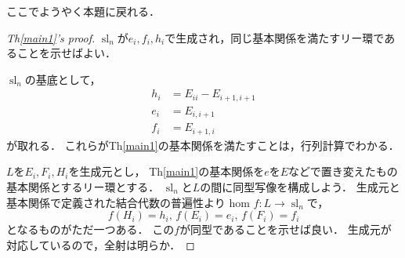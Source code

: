 \documentclass[dvipdfmx,autodetect-engine]{article}
\theoremstyle{definition}
\DeclareMathOperator{\sllie}{sl}
\begin{document}
        ここでようやく本題に戻れる．
        \begin{proof}[Th\ref{main1}'s proof]
            $\sllie_n$が$e_i, f_i, h_i$で生成され，同じ基本関係を満たすリー環であることを示せばよい．
            
            $\sllie_n$の基底として，
            \begin{align}
                h_i &= E_{ii} - E_{i+1, i+1}\\
                e_i &= E_{i,i+1}\\
                f_i &= E_{i+1, i}
            \end{align}
            が取れる．
            これらがTh\ref{main1}の基本関係を満たすことは，行列計算でわかる．
            
            $L$を$E_i, F_i, H_i$を生成元とし，
            Th\ref{main1}の基本関係を$e$を$E$などで置き変えたもの基本関係とするリー環とする．
            $\sllie_n$と$L$の間に同型写像を構成しよう．
            生成元と基本関係で定義された結合代数の普遍性より
            hom $f:L \to \sllie_n$で，
            \[
                f(H_i) = h_i,\, f(E_i) = e_i,\, f(F_i) = f_i
            \]
            となるものがただ一つある．
            この$f$が同型であることを示せば良い．
            生成元が対応しているので，全射は明らか．
            
        \end{proof}
        
\end{document}
